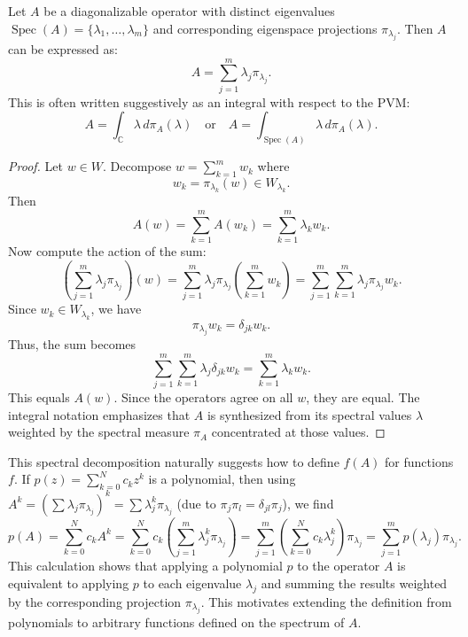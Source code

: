\begin{proposition}
\label{prop:spectral_decomp}
Let $A$ be a diagonalizable operator with distinct eigenvalues $\operatorname{Spec}(A) = \{\lambda_1, \dots, \lambda_m\}$ and corresponding eigenspace projections $\pi_{\lambda_j}$. Then $A$ can be expressed as:
\begin{equation} \label{eq:4.15}
A = \sum_{j=1}^m \lambda_j \pi_{\lambda_j}.
\end{equation}
This is often written suggestively as an integral with respect to the PVM:
\[ A = \int_{\mathbb{C}} \lambda \, d\pi_A(\lambda) \quad \text{or} \quad A = \int_{\operatorname{Spec}(A)} \lambda \, d\pi_A(\lambda). \]
\end{proposition}
\begin{proof}
    Let $w \in W$. Decompose $w = \sum_{k=1}^m w_k$ where 
    \[
    w_k = \pi_{\lambda_k}(w) \in W_{\lambda_k}.
    \]
    Then 
    \[
    A(w) = \sum_{k=1}^m A(w_k) = \sum_{k=1}^m \lambda_k w_k.
    \]
    Now compute the action of the sum:
    \[
    \left( \sum_{j=1}^m \lambda_j \pi_{\lambda_j} \right)(w) = \sum_{j=1}^m \lambda_j \pi_{\lambda_j} \left( \sum_{k=1}^m w_k \right) = \sum_{j=1}^m \sum_{k=1}^m \lambda_j \pi_{\lambda_j} w_k.
    \]
    Since $w_k \in W_{\lambda_k}$, we have
    \[
    \pi_{\lambda_j} w_k = \delta_{jk} w_k.
    \]
    Thus, the sum becomes
    \[
    \sum_{j=1}^m \sum_{k=1}^m \lambda_j \delta_{jk} w_k = \sum_{k=1}^m \lambda_k w_k.
    \]
    This equals $A(w)$. Since the operators agree on all $w$, they are equal. The integral notation emphasizes that $A$ is synthesized from its spectral values $\lambda$ weighted by the spectral measure $\pi_A$ concentrated at those values.
    
\end{proof}

This spectral decomposition naturally suggests how to define $f(A)$ for functions $f$. If $p(z) = \sum_{k=0}^N c_k z^k$ is a polynomial, then using $A^k = (\sum \lambda_j \pi_{\lambda_j})^k = \sum \lambda_j^k \pi_{\lambda_j}$ (due to $\pi_j \pi_l = \delta_{jl} \pi_j$), we find
\[ p(A) = \sum_{k=0}^N c_k A^k = \sum_{k=0}^N c_k \left( \sum_{j=1}^m \lambda_j^k \pi_{\lambda_j} \right) = \sum_{j=1}^m \left( \sum_{k=0}^N c_k \lambda_j^k \right) \pi_{\lambda_j} = \sum_{j=1}^m p(\lambda_j) \pi_{\lambda_j}. \]
This calculation shows that applying a polynomial $p$ to the operator $A$ is equivalent to applying $p$ to each eigenvalue $\lambda_j$ and summing the results weighted by the corresponding projection $\pi_{\lambda_j}$. This motivates extending the definition from polynomials to arbitrary functions defined on the spectrum of $A$.

